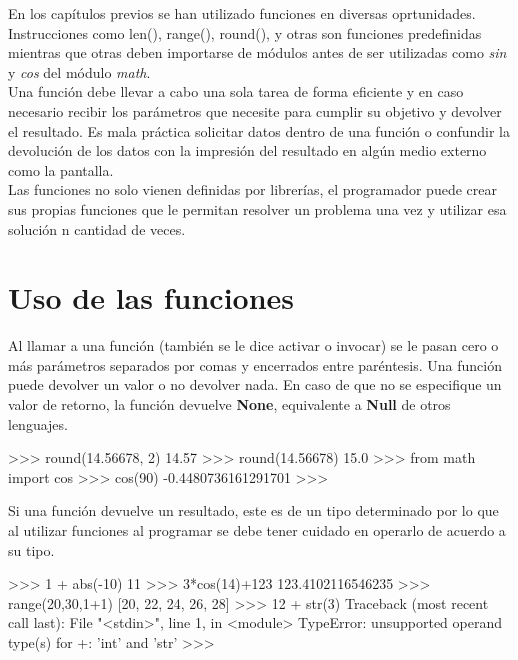 En los capítulos previos se han utilizado funciones en diversas oprtunidades. Instrucciones como len(), range(), round(), y otras son funciones predefinidas mientras que otras deben importarse de módulos antes de ser utilizadas como \textit{sin} y \textit{cos} del módulo \textit{math}.\\

Una función debe llevar a cabo una sola tarea de forma eficiente y en caso necesario recibir los parámetros que necesite para cumplir su objetivo y devolver el resultado. Es mala práctica solicitar datos dentro de una función o confundir la devolución de los datos con la impresión del resultado en algún medio externo como la pantalla.\\

Las funciones no solo vienen definidas por librerías, el programador puede crear sus propias funciones que le permitan resolver un problema una vez y utilizar esa solución n cantidad de veces.

\section{Uso de las funciones}

Al llamar a una función (también se le dice activar o invocar) se le pasan cero o más parámetros separados por comas y encerrados entre paréntesis. Una función puede devolver un valor o no devolver nada. En caso de que no se especifique un valor de retorno, la función devuelve \textbf{None}, equivalente a \textbf{Null} de otros lenguajes.\\

\begin{pyglist} [language=python]
>>> round(14.56678, 2)
14.57
>>> round(14.56678)
15.0
>>> from math import cos
>>> cos(90)
-0.4480736161291701
>>> 
\end{pyglist}

Si una función devuelve un resultado, este es de un tipo determinado por lo que al utilizar funciones al programar se debe tener cuidado en operarlo de acuerdo a su tipo.\\

\begin{pyglist} [language=python]
>>> 1 + abs(-10)
11
>>> 3*cos(14)+123
123.4102116546235
>>> range(20,30,1+1)
[20, 22, 24, 26, 28]
>>> 12 + str(3)
Traceback (most recent call last):
  File "<stdin>", line 1, in <module>
TypeError: unsupported operand type(s) for +: 'int' and 'str'
>>> 
\end{pyglist}


